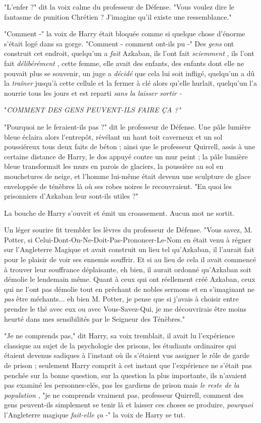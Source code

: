 "L'enfer ?" dit la voix calme du professeur de Défense. "Vous voulez dire le fantasme de punition Chrétien ? J'imagine qu'il existe une ressemblance."

"Comment -" la voix de Harry était bloquée comme si quelque chose d'énorme s'était logé dans sa gorge. "Comment - comment ont-ils pu -" Des \emph{gens}  ont construit cet endroit, quelqu'un a \emph{fait}  Azkaban, ils l'ont fait \emph{sciemment} , ils l'ont fait \emph{délibérément} , cette femme, elle avait des enfants, des enfants dont elle ne pouvait plus se souvenir, un juge a \emph{décidé}  que cela lui soit infligé, quelqu'un a dû la \emph{traîner}  jusqu'à cette cellule et la fermer à clé alors qu'elle hurlait, quelqu'un l'a nourrie tous les jours et est reparti \emph{sans la laisser sortir -} 

"\emph{COMMENT DES GENS PEUVENT-ILS FAIRE ÇA ?"} 

"Pourquoi ne le feraient-ils pas ?" dit le professeur de Défense. Une pâle lumière bleue éclaira alors l'entrepôt, révélant un haut toit caverneux et un sol poussiéreux tous deux faits de béton ; ainsi que le professeur Quirrell, assis à une certaine distance de Harry, le dos appuyé contre un mur peint ; la pâle lumière bleue transformait les murs en parois de glaciers, la poussière au sol en mouchetures de neige, et l'homme lui-même était devenu une sculpture de glace enveloppée de ténèbres là où ses robes noires le recouvraient. "En quoi les prisonniers d'Azkaban leur sont-ils utiles ?"

La bouche de Harry s'ouvrit et émit un croassement. Aucun mot ne sortit.

Un léger sourire fit trembler les lèvres du professeur de Défense. "Vous savez, M. Potter, si Celui-Dont-On-Ne-Doit-Pas-Prononcer-Le-Nom en était venu à régner sur l'Angleterre Magique et avait construit un lieu tel qu'Azkaban, il l'aurait fait pour le plaisir de voir ses ennemis souffrir. Et si au lieu de cela il avait commencé à trouver leur souffrance déplaisante, eh bien, il aurait ordonné qu'Azkaban soit démolie le lendemain même. Quant à ceux qui ont réellement créé Azkaban, ceux qui ne l'ont pas démolie tout en prêchant de nobles sermons et en s'imaginant ne \emph{pas}  être méchants... eh bien M. Potter, je pense que si j'avais à choisir entre prendre le thé avec eux ou avec Vous-Savez-Qui, je me découvrirais être moins heurté dans mes sensibilités par le Seigneur des Ténèbres."

"Je ne comprends pas," dit Harry, sa voix tremblait, il avait lu l'expérience classique au sujet de la psychologie des prisons, les étudiants ordinaires qui étaient devenus sadiques à l'instant où ils s'étaient vus assigner le rôle de garde de prison ; seulement Harry comprit à cet instant que l'expérience ne s'était pas penchée sur la bonne question, sur la question la plus importante, ils n'avaient pas examiné les personnes-clés, pas les gardiens de prison mais \emph{le reste de la population} , "je ne comprends vraiment pas, professeur Quirrell, comment des gens peuvent-ils simplement se tenir là et laisser ces choses se produire, \emph{pourquoi}  l'Angleterre magique \emph{fait-elle ça}  -" la voix de Harry se tut.

